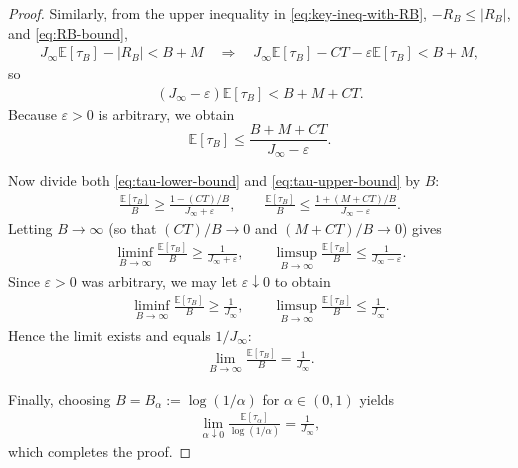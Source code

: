 \begin{proof}
Similarly, from the upper inequality in \eqref{eq:key-ineq-with-RB},
$-R_B \leq |R_B|$, and \eqref{eq:RB-bound},
\begin{align*}
  J_\infty\mathbb{E}[\tau_B] - |R_B|
  < B+M
  \quad\Longrightarrow\quad
  J_\infty\mathbb{E}[\tau_B] - C T - \varepsilon\mathbb{E}[\tau_B]
  < B+M,
\end{align*}
so
\begin{align*}
  (J_\infty - \varepsilon)\mathbb{E}[\tau_B]
  < B + M + C T.
\end{align*}
Because $\varepsilon>0$ is arbitrary, we obtain
\begin{equation}
  \mathbb{E}[\tau_B]
  \leq
  \frac{B + M + C T}{J_\infty - \varepsilon}.
  \label{eq:tau-upper-bound}
\end{equation}

Now divide both \eqref{eq:tau-lower-bound} and \eqref{eq:tau-upper-bound} by $B$:
\begin{align*}
  \frac{\mathbb{E}[\tau_B]}{B}
  \geq
  \frac{1 - (C T)/B}{J_\infty + \varepsilon},
  \qquad
  \frac{\mathbb{E}[\tau_B]}{B}
  \leq
  \frac{1 + (M+C T)/B}{J_\infty - \varepsilon}.
\end{align*}
Letting $B\to\infty$ (so that $(C T)/B \to 0$ and $(M+C T)/B\to 0$) gives
\begin{align*}
  \liminf_{B\to\infty}
  \frac{\mathbb{E}[\tau_B]}{B}
  \geq \frac{1}{J_\infty + \varepsilon},
  \qquad
  \limsup_{B\to\infty}
  \frac{\mathbb{E}[\tau_B]}{B}
  \leq \frac{1}{J_\infty - \varepsilon}.
\end{align*}
Since $\varepsilon>0$ was arbitrary, we may let $\varepsilon\downarrow 0$ to obtain
\begin{align*}
  \liminf_{B\to\infty}
  \frac{\mathbb{E}[\tau_B]}{B}
  \geq \frac{1}{J_\infty},
  \qquad
  \limsup_{B\to\infty}
  \frac{\mathbb{E}[\tau_B]}{B}
  \leq \frac{1}{J_\infty}.
\end{align*}
Hence the limit exists and equals $1/J_\infty$:
\begin{align*}
  \lim_{B\to\infty}
  \frac{\mathbb{E}[\tau_B]}{B}
  = \frac{1}{J_\infty}.
\end{align*}

Finally, choosing $B=B_\alpha := \log(1/\alpha)$ for $\alpha\in(0,1)$ yields
\begin{align*}
  \lim_{\alpha\downarrow 0}
  \frac{\mathbb{E}[\tau_\alpha]}{\log(1/\alpha)}
  = \frac{1}{J_\infty},
\end{align*}
which completes the proof.
\end{proof}


